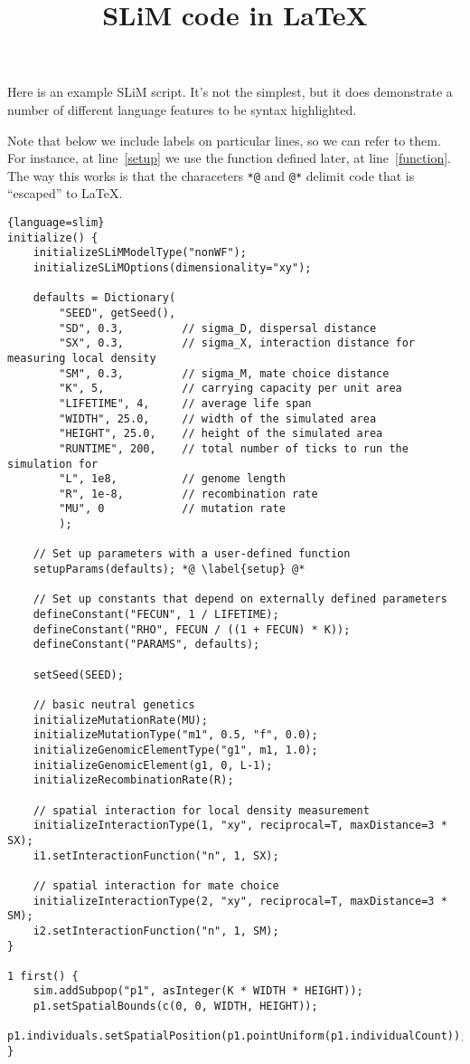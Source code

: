 \documentclass{article}
\title{SLiM code in \LaTeX}
\begin{document}
Here is an example SLiM script.
It's not the simplest, but it does demonstrate a number of different language features
to be syntax highlighted.

Note that below we include labels on particular lines,
so we can refer to them.
For instance,
at line~\ref{setup} we use the function defined later,
at line~\ref{function}.
The way this works is that the characeters \verb|*@| and \verb|@*| delimit
code that is ``escaped'' to \LaTeX.

\begin{lstlisting}{language=slim}
initialize() {
	initializeSLiMModelType("nonWF");
	initializeSLiMOptions(dimensionality="xy");
	
	defaults = Dictionary(
		"SEED", getSeed(),
		"SD", 0.3,         // sigma_D, dispersal distance
		"SX", 0.3,         // sigma_X, interaction distance for measuring local density
		"SM", 0.3,         // sigma_M, mate choice distance
		"K", 5,            // carrying capacity per unit area
		"LIFETIME", 4,     // average life span
		"WIDTH", 25.0,     // width of the simulated area
		"HEIGHT", 25.0,    // height of the simulated area
		"RUNTIME", 200,    // total number of ticks to run the simulation for
		"L", 1e8,          // genome length
		"R", 1e-8,         // recombination rate
		"MU", 0            // mutation rate
		);	
	
	// Set up parameters with a user-defined function
    setupParams(defaults); *@ \label{setup} @*
	
	// Set up constants that depend on externally defined parameters
	defineConstant("FECUN", 1 / LIFETIME);
	defineConstant("RHO", FECUN / ((1 + FECUN) * K));
	defineConstant("PARAMS", defaults);
	
	setSeed(SEED);
	
	// basic neutral genetics
	initializeMutationRate(MU);
	initializeMutationType("m1", 0.5, "f", 0.0);
	initializeGenomicElementType("g1", m1, 1.0);
	initializeGenomicElement(g1, 0, L-1);
	initializeRecombinationRate(R);
	
	// spatial interaction for local density measurement
	initializeInteractionType(1, "xy", reciprocal=T, maxDistance=3 * SX);
	i1.setInteractionFunction("n", 1, SX);
	
	// spatial interaction for mate choice
	initializeInteractionType(2, "xy", reciprocal=T, maxDistance=3 * SM);
	i2.setInteractionFunction("n", 1, SM);
}

1 first() {
	sim.addSubpop("p1", asInteger(K * WIDTH * HEIGHT));
	p1.setSpatialBounds(c(0, 0, WIDTH, HEIGHT));
	p1.individuals.setSpatialPosition(p1.pointUniform(p1.individualCount));
}


\end{lstlisting}
\end{document}
